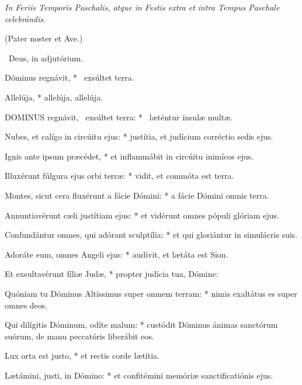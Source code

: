 

\textit{In Feriis Temporis Paschalis, atque in Festis extra et intra Tempus Paschale celebrándis.}

(Pater noster et Ave.)

\V\ Deus, in adjutórium.


 Dóminus regnávit, * \textdagger\ exsúltet terra. \textdaggerdbl


 Allelúja, * allelúja, allelúja.


\lettrine[lines=2]{D}{OMINUS} regnávit, \textdagger\ exsúltet terra: * \textdaggerdbl\ læténtur ínsulæ multæ.

Nubes, et calígo in circúitu ejus: * justítia, et judícium corréctio sedis ejus.

Ignis ante ipsum præcédet, * et inflammábit in circúitu inimícos ejus.

Illuxérunt fúlgura ejus orbi terræ: * vidit, et commóta est terra.

Montes, sicut cera fluxérunt a fácie Dómini: * a fácie Dómini omnis terra.

Annuntiavérunt cæli justítiam ejus: * et vidérunt omnes pópuli glóriam ejus.

Confundántur omnes, qui adórant sculptília: * et qui gloriántur in simulácris suis.

Adoráte eum, omnes Angeli ejus: * audívit, et lætáta est Sion.

Et exsultavérunt fíliæ Judæ, * propter judícia tua, Dómine:

Quóniam tu Dóminus Altíssimus super omnem terram: * nimis exaltátus es super omnes deos.

Qui dilígitis Dóminum, odíte malum: * custódit Dóminus ánimas sanctórum suórum, de manu peccatóris liberábit eos.

Lux orta est justo, * et rectis corde lætítia.

Lætámini, justi, in Dómino: * et confitémini memóriæ sanctificatiónis ejus.

